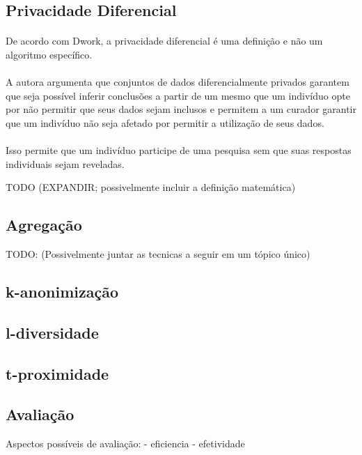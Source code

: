 \subsection{Privacidade Diferencial}

\paragraph{} De acordo com Dwork\cite{dwork2008differential}, a privacidade diferencial é uma definição e não um algoritmo específico. 

\paragraph{} A autora argumenta que conjuntos de dados diferencialmente privados garantem que seja possível inferir conclusões a partir de um mesmo que um indivíduo opte por não permitir que seus dados sejam inclusos e permitem a um curador garantir que um indivíduo não seja afetado por permitir a utilização de seus dados.

\paragraph{} Isso permite que um indivíduo participe de uma pesquisa sem que suas respostas individuais sejam reveladas.

TODO (EXPANDIR; possivelmente incluir a definição matemática)


\subsection{Agregação}
TODO: (Possivelmente juntar as tecnicas a seguir em um tópico único)

\subsection{k-anonimização}

\subsection{l-diversidade}

\subsection{t-proximidade}

\subsection{Avaliação}
Aspectos possíveis de avaliação:
    - eficiencia
    - efetividade

